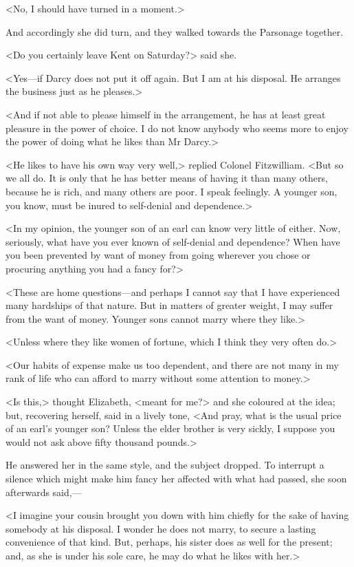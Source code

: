 <No, I should have turned in a moment.>

And accordingly she did turn, and they walked towards the Parsonage together.

<Do you certainly leave Kent on Saturday?> said she.

<Yes—if Darcy does not put it off again. But I am at his disposal. He arranges the business just as he pleases.>

<And if not able to please himself in the arrangement, he has at least great pleasure in the power of choice. I do not know anybody who seems more to enjoy the power of doing what he likes than Mr Darcy.>

<He likes to have his own way very well,> replied Colonel Fitzwilliam. <But so we all do. It is only that he has better means of having it than many others, because he is rich, and many others are poor. I speak feelingly. A younger son, you know, must be inured to self-denial and dependence.>

<In my opinion, the younger son of an earl can know very little of either. Now, seriously, what have you ever known of self-denial and dependence? When have you been prevented by want of money from going wherever you chose or procuring anything you had a fancy for?>

<These are home questions—and perhaps I cannot say that I have experienced many hardships of that nature. But in matters of greater weight, I may suffer from the want of money. Younger sons cannot marry where they like.>

<Unless where they like women of fortune, which I think they very often do.>

<Our habits of expense make us too dependent, and there are not many in my rank of life who can afford to marry without some attention to money.>

<Is this,> thought Elizabeth, <meant for me?> and she coloured at the idea; but, recovering herself, said in a lively tone, <And pray, what is the usual price of an earl's younger son? Unless the elder brother is very sickly, I suppose you would not ask above fifty thousand pounds.>

He answered her in the same style, and the subject dropped. To interrupt a silence which might make him fancy her affected with what had passed, she soon afterwards said,—

<I imagine your cousin brought you down with him chiefly for the sake of having somebody at his disposal. I wonder he does not marry, to secure a lasting convenience of that kind. But, perhaps, his sister does as well for the present; and, as she is under his sole care, he may do what he likes with her.>

